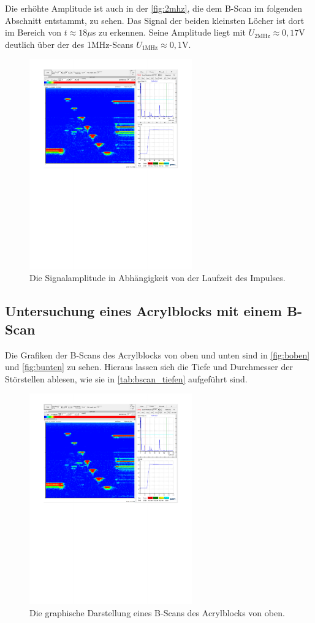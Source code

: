 Die erhöhte Amplitude ist auch in der \autoref{fig:2mhz}, die dem B-Scan im folgenden Abschnitt entstammt, zu sehen. Das Signal der beiden kleinsten Löcher 
ist dort im Bereich von $t \approx 18\mu$s zu erkennen. 
Seine Amplitude liegt mit $U_{\mathrm{2MHz}} \approx 0,17$V deutlich über der des 1MHz-Scans $U_{\mathrm{1MHz}} \approx 0,1$V.



\begin{figure}[H]
  \centering
  \includegraphics[width = 7cm]{content/2Mhz.pdf}
  \caption{Die Signalamplitude in Abhängigkeit von der Laufzeit des Impulses.}
  \label{fig:2mhz}
\end{figure}


\subsection{Untersuchung eines Acrylblocks mit einem B-Scan}

Die Grafiken der B-Scans des Acrylblocks von oben und unten 
sind in \autoref{fig:boben} und \autoref{fig:bunten} zu sehen.
Hieraus lassen sich die Tiefe und Durchmesser der Störstellen ablesen, wie sie 
in \autoref{tab:bscan_tiefen} aufgeführt sind.


\begin{figure}[H]
  \centering
  \includegraphics[width = 7cm]{content/bscan_oben.pdf}
  \caption{Die graphische Darstellung eines B-Scans des Acrylblocks von oben.}
  \label{fig:boben}
\end{figure}

